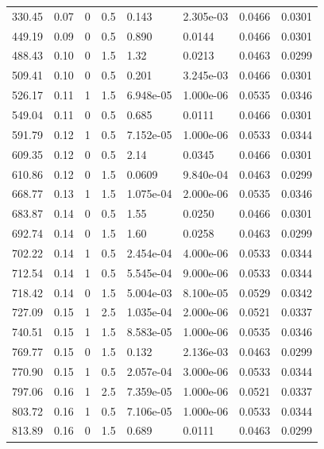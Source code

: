 \documentclass[preview]{standalone}
\begin{document}
{{\begin{tabular}{L{1.2cm}C{1.2cm} C{0.3cm}C{0.5cm} C{1.4cm}C{1.4cm} C{1.4cm}C{1.4cm}}
  330.45  &  0.07  & 0     & 0.5 &  0.143  & 2.305e-03  & 0.0466 &  0.0301   \\ 
  449.19  &  0.09  & 0     & 0.5 &  0.890  & 0.0144  & 0.0466 &  0.0301   \\ 
  488.43  &  0.10  & 0     & 1.5 &  1.32  & 0.0213  & 0.0463 &  0.0299   \\ 
  509.41  &  0.10  & 0     & 0.5 &  0.201  & 3.245e-03  & 0.0466 &  0.0301   \\ 
  526.17  &  0.11  & 1     & 1.5 &  6.948e-05  & 1.000e-06  & 0.0535 &  0.0346   \\ 
  549.04  &  0.11  & 0     & 0.5 &  0.685  & 0.0111  & 0.0466 &  0.0301   \\ 
  591.79  &  0.12  & 1     & 0.5 &  7.152e-05  & 1.000e-06  & 0.0533 &  0.0344   \\ 
  609.35  &  0.12  & 0     & 0.5 &  2.14  & 0.0345  & 0.0466 &  0.0301   \\ 
  610.86  &  0.12  & 0     & 1.5 &  0.0609  & 9.840e-04  & 0.0463 &  0.0299   \\ 
  668.77  &  0.13  & 1     & 1.5 &  1.075e-04  & 2.000e-06  & 0.0535 &  0.0346   \\ 
  683.87  &  0.14  & 0     & 0.5 &  1.55  & 0.0250  & 0.0466 &  0.0301   \\ 
  692.74  &  0.14  & 0     & 1.5 &  1.60  & 0.0258  & 0.0463 &  0.0299   \\ 
  702.22  &  0.14  & 1     & 0.5 &  2.454e-04  & 4.000e-06  & 0.0533 &  0.0344   \\ 
  712.54  &  0.14  & 1     & 0.5 &  5.545e-04  & 9.000e-06  & 0.0533 &  0.0344   \\ 
  718.42  &  0.14  & 0     & 1.5 &  5.004e-03  & 8.100e-05  & 0.0529 &  0.0342   \\ 
  727.09  &  0.15  & 1     & 2.5 &  1.035e-04  & 2.000e-06  & 0.0521 &  0.0337   \\ 
  740.51  &  0.15  & 1     & 1.5 &  8.583e-05  & 1.000e-06  & 0.0535 &  0.0346   \\ 
  769.77  &  0.15  & 0     & 1.5 &  0.132  & 2.136e-03  & 0.0463 &  0.0299   \\ 
  770.90  &  0.15  & 1     & 0.5 &  2.057e-04  & 3.000e-06  & 0.0533 &  0.0344   \\ 
  797.06  &  0.16  & 1     & 2.5 &  7.359e-05  & 1.000e-06  & 0.0521 &  0.0337   \\ 
  803.72  &  0.16  & 1     & 0.5 &  7.106e-05  & 1.000e-06  & 0.0533 &  0.0344   \\ 
  813.89  &  0.16  & 0     & 1.5 &  0.689  & 0.0111  & 0.0463 &  0.0299   \\ 

\end{tabular}}}
\end{document}
